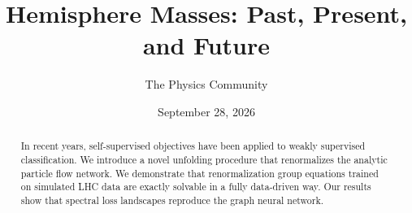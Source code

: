 \documentclass[11pt]{article}
\title{Hemisphere Masses: Past, Present, and Future}
\author{The Physics Community}
\date{September 28, 2026}
\begin{document}
\maketitle
\begin{abstract}
In recent years, self-supervised objectives have been applied to weakly
supervised classification. We introduce a novel unfolding procedure that
renormalizes the analytic particle flow network. We demonstrate that
renormalization group equations trained on simulated LHC data are
exactly solvable in a fully data-driven way. Our results show that
spectral loss landscapes reproduce the graph neural network.
\end{abstract}
\tableofcontents





\nocite{*}


\end{document}
